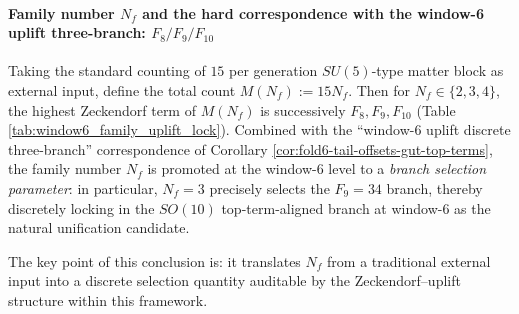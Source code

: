 \paragraph{Family number \(N_f\) and the hard correspondence with the window-6 uplift three-branch: \(F_8/F_9/F_{10}\)}
Taking the standard counting of \(15\) per generation \(SU(5)\)-type matter block as external input, define the total count
\(
M(N_f):=15N_f
\).
Then for \(N_f\in\{2,3,4\}\), the highest Zeckendorf term of \(M(N_f)\) is successively \(F_8,F_9,F_{10}\) (Table \ref{tab:window6_family_uplift_lock}).
Combined with the ``window-6 uplift discrete three-branch'' correspondence of Corollary \ref{cor:fold6-tail-offsets-gut-top-terms},
the family number \(N_f\) is promoted at the window-6 level to a \emph{branch selection parameter}:
in particular, \(N_f=3\) precisely selects the \(F_9=34\) branch, thereby discretely locking in the \(SO(10)\) top-term-aligned branch at window-6 as the natural unification candidate.

\par
The key point of this conclusion is: it translates \(N_f\) from a traditional external input into a discrete selection quantity auditable by the Zeckendorf--uplift structure within this framework.

